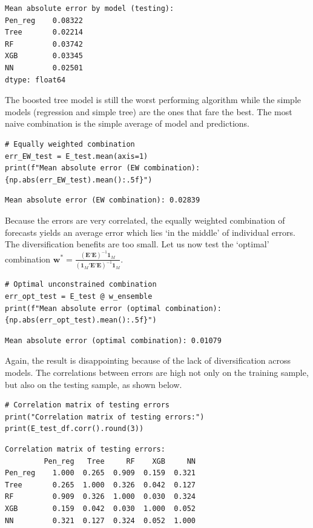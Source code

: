 \begin{verbatim}
Mean absolute error by model (testing):
Pen_reg    0.08322
Tree       0.02214
RF         0.03742
XGB        0.03345
NN         0.02501
dtype: float64
\end{verbatim}

The boosted tree model is still the worst performing algorithm while the simple models (regression and simple tree) are the ones that fare the best. The most naive combination is the simple average of model and predictions.

\begin{verbatim}
# Equally weighted combination
err_EW_test = E_test.mean(axis=1)
print(f"Mean absolute error (EW combination): {np.abs(err_EW_test).mean():.5f}")
\end{verbatim}

\begin{verbatim}
Mean absolute error (EW combination): 0.02839
\end{verbatim}

Because the errors are very correlated, the equally weighted combination of forecasts yields an average error which lies `in the middle' of individual errors. The diversification benefits are too small. Let us now test the `optimal' combination $\textbf{w}^*=\frac{(\textbf{E}'\textbf{E})^{ -1}\textbf{1}_M}{(\textbf{1}_M'\textbf{E}'\textbf{E})^{ -1}\textbf{1}_M}$.

\begin{verbatim}
# Optimal unconstrained combination
err_opt_test = E_test @ w_ensemble
print(f"Mean absolute error (optimal combination): {np.abs(err_opt_test).mean():.5f}")
\end{verbatim}

\begin{verbatim}
Mean absolute error (optimal combination): 0.01079
\end{verbatim}

Again, the result is disappointing because of the lack of diversification across models. The correlations between errors are high not only on the training sample, but also on the testing sample, as shown below.

\begin{verbatim}
# Correlation matrix of testing errors
print("Correlation matrix of testing errors:")
print(E_test_df.corr().round(3))
\end{verbatim}

\begin{verbatim}
Correlation matrix of testing errors:
         Pen_reg   Tree     RF    XGB     NN
Pen_reg    1.000  0.265  0.909  0.159  0.321
Tree       0.265  1.000  0.326  0.042  0.127
RF         0.909  0.326  1.000  0.030  0.324
XGB        0.159  0.042  0.030  1.000  0.052
NN         0.321  0.127  0.324  0.052  1.000
\end{verbatim}

